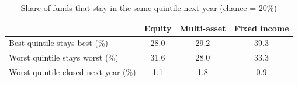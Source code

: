 \begin{table}[htbp]\centering
\caption{Share of funds that stay in the same quintile next year (chance = 20\%)}
\begin{tabular}{lccc}
\toprule
& Equity & Multi-asset & Fixed income \\
\midrule
Best quintile stays best (\%) & 28.0 & 29.2 & 39.3 \\
Worst quintile stays worst (\%) & 31.6 & 28.0 & 33.3 \\
Worst quintile closed next year (\%) & 1.1 & 1.8 & 0.9 \\
\bottomrule
\end{tabular}
\end{table}
